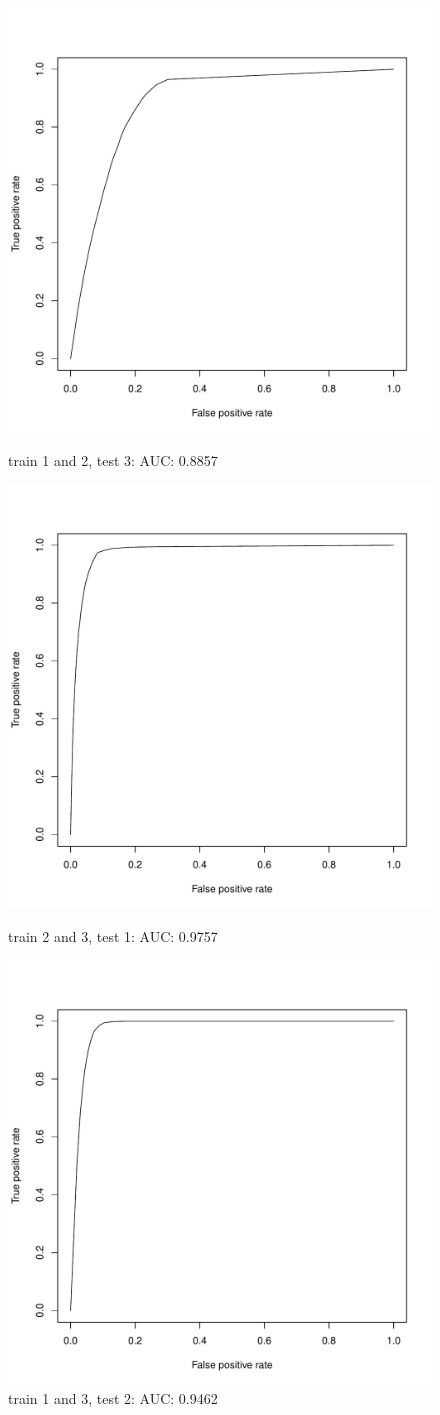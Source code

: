 \documentclass{article}\usepackage[]{graphicx}\usepackage[]{color}
\begin{document}
\begin{figure}[H]
  \includegraphics[width=\linewidth, height = 100pts]{ROC_image9.pdf}
  \caption{train 1 and 2, test 3: AUC: 0.8857}
\endminipage
{}
  \includegraphics[width=\linewidth, height = 100pts]{ROC_image1.pdf}
  \caption{train 2 and 3, test 1: AUC: 0.9757}
\endminipage
{}
  \includegraphics[width=\linewidth, height = 100pts]{ROC_image5.pdf}
  \caption{train 1 and 3, test 2: AUC: 0.9462}
\endminipage

\end{figure}
\end{document}
